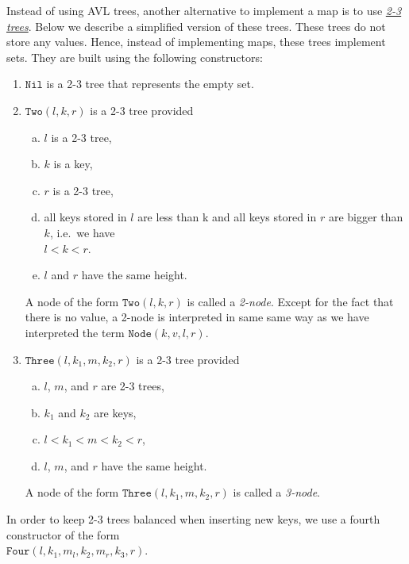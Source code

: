 \exercise
Instead of using AVL trees, another alternative to implement a map is to use 
\href{https://en.wikipedia.org/wiki/2-3_tree}{\emph{2-3 trees}}.  
Below we describe a simplified version of these trees.  These trees do not store any values.  Hence, instead
of implementing maps, these trees implement sets. They are built using the following constructors:
\begin{enumerate}
\item $\mathtt{Nil}$ is a 2-3 tree that represents the empty set.
\item $\mathtt{Two}(l, k, r)$ is a 2-3 tree provided
      \begin{enumerate}[(a)]
      \item $l$ is a 2-3 tree,
      \item $k$ is a key,
      \item $r$ is a 2-3 tree,
      \item all keys stored in $l$ are less than k and all keys stored in $r$ are bigger than $k$,
            i.e.~we have
            \\[0.2cm]
            \hspace*{1.3cm}
            $l < k < r$.
      \item $l$ and $r$ have the same height.
      \end{enumerate}
      A node of the form  $\mathtt{Two}(l, k, r)$ is called a \emph{2-node}.  Except for the fact
      that there is no value, a 2-node is
      interpreted in same same way as we have interpreted the term $\mathtt{Node}(k, v, l, r)$.
\item $\mathtt{Three}(l, k_1, m, k_2, r)$ is a 2-3 tree provided
      \begin{enumerate}[(a)]
      \item $l$, $m$, and $r$ are 2-3 trees,
      \item $k_1$ and $k_2$ are keys,
      \item $l < k_1 < m < k_2 < r$,
      \item $l$, $m$, and $r$ have the same height.
      \end{enumerate}
      A node of the form  $\mathtt{Three}(l, k_1, m, k_2, r)$ is called a \emph{3-node}.
\end{enumerate}
In order to keep 2-3 trees balanced when inserting new keys, we use a fourth constructor of the form
\\[0.2cm]
\hspace*{1.3cm}
$\mathtt{Four}(l,k_1,m_l, k_2, m_r, k_3, r)$.
\\[0.2cm]
